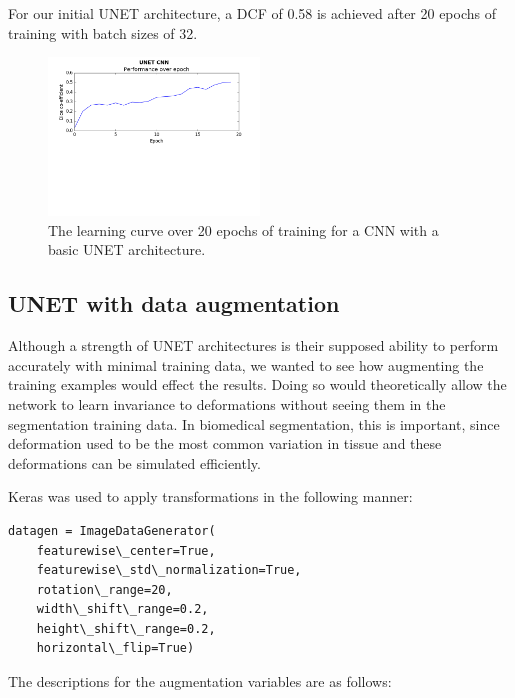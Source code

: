 \documentclass[letterpaper]{article}
\begin{document}
For our initial UNET architecture, a DCF of 0.58 is achieved after 20 epochs of training with batch sizes of 32. 

 \begin{figure}[H]
  \centerline{\includegraphics[width=0.5\textwidth]{Plots/UNETSimple20.png}}
  \caption{The learning curve over 20 epochs of training for a CNN with a basic UNET architecture.}
  \label{fig:unet3}
\end{figure}

\subsection{UNET with data augmentation}

Although a strength of UNET architectures is their supposed ability to perform accurately with minimal training data, we wanted to see how augmenting the training examples would effect the results. Doing so would theoretically allow the network to learn invariance to deformations without seeing them in the segmentation training data. In biomedical segmentation, this is important, since deformation used to be the most common variation in tissue and these deformations can be simulated efficiently. 

Keras was used to apply transformations in the following manner:

\begin{lstlisting}
datagen = ImageDataGenerator(
    featurewise\_center=True,
    featurewise\_std\_normalization=True,
    rotation\_range=20,
    width\_shift\_range=0.2,
    height\_shift\_range=0.2,
    horizontal\_flip=True)
\end{lstlisting}

The descriptions for the augmentation variables are as follows:
\end{document}
